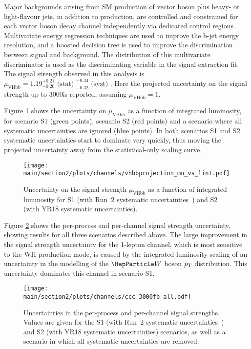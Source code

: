 Major backgrounds arising from SM production of vector boson plus heavy- or light-flavour jets, in addition to \ttbar production, are 
controlled and constrained for each vector boson decay channel independently via dedicated control regions. Multivariate energy
regression techniques are used to improve the b-jet energy resolution, and a boosted decision tree is used to improve the discrimination 
between signal and background. The distribution of this multivariate discriminator is used as the discriminating
variable in the signal extraction fit. 
The signal strength observed in this analysis is 
$\mu_{\text{VHbb}} = 1.19^{+0.21}_{-0.20}\text{ (stat) }^{+0.34}_{-0.32}\text{ (syst) }$. Here the projected uncertainty
on the signal strength up to 3000\Uifb is reported, assuming $\mu_{\text{VHbb}} = 1$.

Figure \ref{fig:vhbb_projection_intlumi} shows the uncertainty on $\mu_{\text{VHbb}}$ as a function
of integrated luminosity, for scenario S1 (green points), scenario S2 (red points) and a scenario
where all systematic uncertainties are ignored (blue points).
In both scenarios
S1 and S2 systematic uncertainties start to dominate very quickly, thus moving the projected 
uncertainty away from the statistical-only scaling curve.

\begin{figure}[h!]
\begin{center}
\texttt{[image: \\main/section2/plots/channels/vhbbprojection\_mu\_vs\_lint.pdf]}
\end{center}
\caption{Uncertainty on the signal strength $\mu_{\text{VHbb}}$ as a function of integrated luminosity for S1 (with Run~2 systematic uncertainties~\cite{HIG16044}) and S2 (with YR18 systematic uncertainties).}
\label{fig:vhbb_projection_intlumi}
\end{figure}

Figure \ref{fig:vhbb_proj_bars} shows the per-process and
per-channel signal strength uncertainty, showing results for all three scenarios described above.
The large improvement in the signal strength uncertainty for the 1-lepton channel, which is most sensitive to the WH production
mode, is caused by the integrated luminosity scaling of an uncertainty in the modelling of the $\PW$ boson $p\sb{\scriptstyle\mathrm{T}}$ distribution. This uncertainty dominates this channel
in scenario S1.

\begin{figure}[h!]
\begin{center}
\texttt{[image: \\main/section2/plots/channels/ccc\_3000fb\_all.pdf]}
\end{center}
\caption{Uncertainties in the per-process and per-channel signal strengths. Values are given for the S1 (with Run~2 systematic uncertainties~\cite{HIG16044}) and S2 (with YR18 systematic uncertainties) scenarios, as well as a scenario in which all systematic uncertainties are removed.}
\label{fig:vhbb_proj_bars}
\end{figure}

